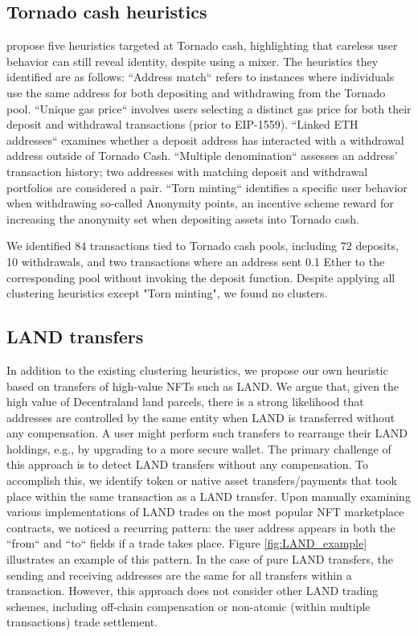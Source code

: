 \documentclass[12pt,a4paper,titlepage,oneside,english]{article}
\begin{document}
\subsection{Tornado cash heuristics}

\cite{wu2022tutela} propose five heuristics targeted at Tornado cash, highlighting that careless user behavior can still reveal identity, despite using a mixer. The heuristics they identified are as follows: \newline
``Address match`` refers to instances where individuals use the same address for both depositing and withdrawing from the Tornado pool. ``Unique gas price`` involves users selecting a distinct gas price for both their deposit and withdrawal transactions (prior to EIP-1559). ``Linked ETH addresses`` examines whether a deposit address has interacted with a withdrawal address outside of Tornado Cash. ``Multiple denomination`` assesses an address' transaction history; two addresses with matching deposit and withdrawal portfolios are considered a pair. ``Torn minting`` identifies a specific user behavior when withdrawing so-called Anonymity points, an incentive scheme reward for increasing the anonymity set when depositing assets into Tornado cash.

We identified 84 transactions tied to Tornado cash pools, including 72 deposits, 10 withdrawals, and two transactions where an address sent 0.1 Ether to the corresponding pool without invoking the deposit function.  Despite applying all clustering heuristics except "Torn minting", we found no clusters.

\subsection{LAND transfers}
In addition to the existing clustering heuristics, we propose our own heuristic based on transfers of high-value NFTs such as LAND. We argue that, given the high value of Decentraland land parcels, there is a strong likelihood that addresses are controlled by the same entity when LAND is transferred without any compensation. A user might perform such transfers to rearrange their LAND holdings, e.g., by upgrading to a more secure wallet. \newline
The primary challenge of this approach is to detect LAND transfers without any compensation. To accomplish this, we identify token or native asset transfers/payments that took place within the same transaction as a LAND transfer. Upon manually examining various implementations of LAND trades on the most popular NFT marketplace contracts, we noticed a recurring pattern: the user address appears in both the ``from`` and ``to`` fields if a trade takes place. Figure \ref{fig:LAND_example} illustrates an example of this pattern. 
In the case of pure LAND transfers, the sending and receiving addresses are the same for all transfers within a transaction. However, this approach does not consider other LAND trading schemes, including off-chain compensation or non-atomic (within multiple transactions) trade settlement.
\end{document}
